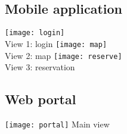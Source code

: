 \newpage
\subsection{Mobile application}
\bigbreak
\begin{center}
\texttt{[image: login]}\\
View 1: login
\newpage
\texttt{[image: map]}\\
View 2: map
\newpage
\texttt{[image: reserve]}\\
View 3: reservation
\end{center}
\newpage

\subsection{Web portal}
\bigbreak
\begin{center}
\texttt{[image: portal]}
Main view
\end{center}




